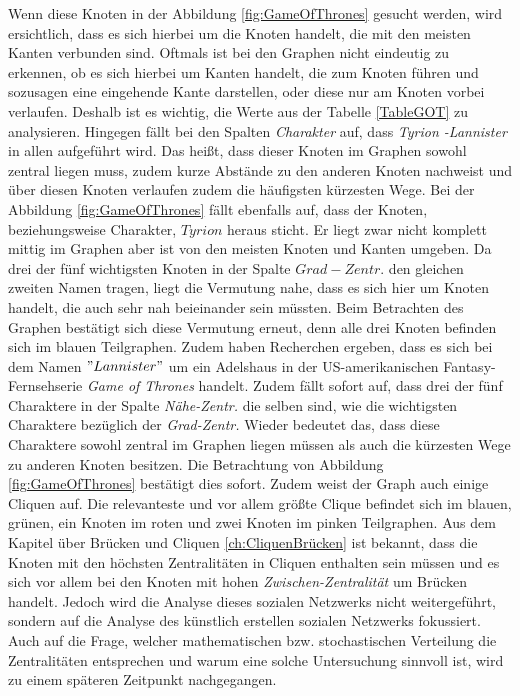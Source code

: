 Wenn diese Knoten in der Abbildung \ref{fig:GameOfThrones} gesucht werden, wird ersichtlich, dass es sich hierbei um die Knoten handelt, die mit den meisten Kanten verbunden sind. Oftmals ist bei den Graphen nicht eindeutig zu erkennen, ob es sich hierbei um Kanten handelt, die zum Knoten führen und sozusagen eine eingehende Kante darstellen, oder diese nur am Knoten vorbei verlaufen. Deshalb ist es wichtig, die Werte aus der Tabelle \ref{TableGOT} zu analysieren. Hingegen fällt bei den Spalten \textit{Charakter} auf, dass \textit{Tyrion -Lannister} in allen aufgeführt wird. Das heißt, dass dieser Knoten im Graphen sowohl zentral liegen muss, zudem kurze Abstände zu den anderen Knoten nachweist und über diesen Knoten verlaufen zudem die häufigsten kürzesten Wege. Bei der Abbildung \ref{fig:GameOfThrones} fällt ebenfalls auf, dass der Knoten, beziehungsweise Charakter, $Tyrion$  heraus sticht. Er liegt zwar nicht komplett mittig im Graphen aber ist von den meisten Knoten und Kanten umgeben. Da drei der fünf wichtigsten Knoten  in der Spalte $Grad-Zentr.$ den gleichen zweiten Namen tragen, liegt die Vermutung nahe, dass es sich hier um Knoten handelt, die auch sehr nah beieinander sein müssten. Beim Betrachten des Graphen bestätigt sich diese Vermutung erneut, denn alle drei Knoten befinden sich im blauen Teilgraphen. Zudem haben Recherchen ergeben, dass es sich bei dem Namen $"Lannister"$ um ein Adelshaus in der US-amerikanischen Fantasy-Fernsehserie \textit{Game of Thrones} handelt. Zudem fällt sofort auf, dass drei der fünf Charaktere in der Spalte \textit{Nähe-Zentr.} die selben sind, wie die wichtigsten Charaktere bezüglich der \textit{Grad-Zentr.} Wieder bedeutet das, dass diese Charaktere sowohl zentral im Graphen liegen müssen als auch die kürzesten Wege zu anderen Knoten besitzen. Die Betrachtung von Abbildung \ref{fig:GameOfThrones} bestätigt dies sofort. Zudem weist der Graph auch einige Cliquen auf. Die relevanteste und vor allem größte Clique befindet sich im blauen, grünen, ein Knoten im roten und zwei Knoten im pinken Teilgraphen. Aus dem Kapitel über Brücken und Cliquen \ref{ch:CliquenBrücken} ist bekannt, dass die Knoten mit den höchsten Zentralitäten in Cliquen enthalten sein müssen und es sich vor allem bei den Knoten mit hohen \textit{Zwischen-Zentralität} um Brücken handelt. Jedoch wird die Analyse dieses sozialen Netzwerks nicht weitergeführt, sondern auf die Analyse des künstlich erstellen sozialen Netzwerks fokussiert. Auch auf die Frage, welcher mathematischen bzw. stochastischen Verteilung die Zentralitäten entsprechen und warum eine solche Untersuchung sinnvoll ist, wird zu einem späteren Zeitpunkt nachgegangen.


